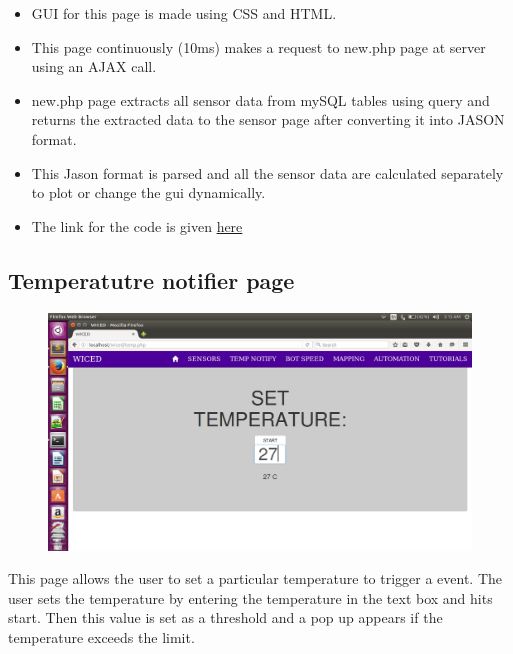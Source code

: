 \documentclass[a4paper,12pt,oneside]{book}
\begin{document}
        \begin{itemize}
        \item GUI for this page is made using CSS and HTML.
        \item This page continuously (10ms) makes a request to new.php page at server using an AJAX call.
        \item new.php page extracts all sensor data from mySQL tables using query and returns the extracted data to the sensor page after converting it into JASON format.
        \item This Jason format is parsed and all the sensor data are calculated separately to plot or change the gui dynamically.
        
        \item The link for the code is given \href{https://github.com/eYSIP-2016/Wiced-Sense/blob/master/Codes/wiced%20web/javascript/sensors.js}{here}
        \end{itemize}




\newpage
\subsection{Temperatutre notifier page}



\begin{figure}[h]
        \centering
    	\includegraphics[scale=0.2]{temp12.png}
	    \end{figure}
	    
	    
 This page allows the user to set a particular temperature to trigger a event. The user sets the temperature by entering the temperature in the text box and hits start. Then this value is set as a threshold and a pop up appears if the temperature exceeds the limit.\\
\end{document}
